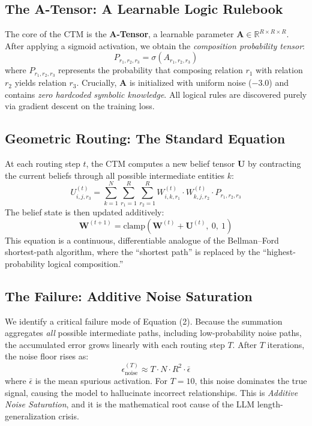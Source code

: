 \documentclass[11pt,a4paper]{article}
\begin{document}
\subsection{The A-Tensor: A Learnable Logic Rulebook}
The core of the CTM is the \textbf{A-Tensor}, a learnable parameter $\mathbf{A} \in \mathbb{R}^{R \times R \times R}$. After applying a sigmoid activation, we obtain the \textit{composition probability tensor}:
\begin{equation}
    P_{r_1, r_2, r_3} = \sigma(A_{r_1, r_2, r_3})
\end{equation}
where $P_{r_1, r_2, r_3}$ represents the probability that composing relation $r_1$ with relation $r_2$ yields relation $r_3$. Crucially, $\mathbf{A}$ is initialized with uniform noise ($-3.0$) and contains \textit{zero hardcoded symbolic knowledge}. All logical rules are discovered purely via gradient descent on the training loss.

\subsection{Geometric Routing: The Standard Equation}
At each routing step $t$, the CTM computes a new belief tensor $\mathbf{U}$ by contracting the current beliefs through all possible intermediate entities $k$:
\begin{equation}
    U_{i,j,r_3}^{(t)} = \sum_{k=1}^{N} \sum_{r_1=1}^{R} \sum_{r_2=1}^{R} W_{i,k,r_1}^{(t)} \cdot W_{k,j,r_2}^{(t)} \cdot P_{r_1, r_2, r_3}
\end{equation}
The belief state is then updated additively:
\begin{equation}
    \mathbf{W}^{(t+1)} = \text{clamp}\left(\mathbf{W}^{(t)} + \mathbf{U}^{(t)},\ 0,\ 1\right)
\end{equation}
This equation is a continuous, differentiable analogue of the Bellman--Ford shortest-path algorithm, where the ``shortest path'' is replaced by the ``highest-probability logical composition.''

\subsection{The Failure: Additive Noise Saturation}
We identify a critical failure mode of Equation (2). Because the summation aggregates \textit{all} possible intermediate paths, including low-probability noise paths, the accumulated error grows linearly with each routing step $T$. After $T$ iterations, the noise floor rises as:
\begin{equation}
    \epsilon_{\text{noise}}^{(T)} \approx T \cdot N \cdot R^2 \cdot \bar{\epsilon}
\end{equation}
where $\bar{\epsilon}$ is the mean spurious activation. For $T = 10$, this noise dominates the true signal, causing the model to hallucinate incorrect relationships. This is \textit{Additive Noise Saturation}, and it is the mathematical root cause of the LLM length-generalization crisis.
\end{document}
